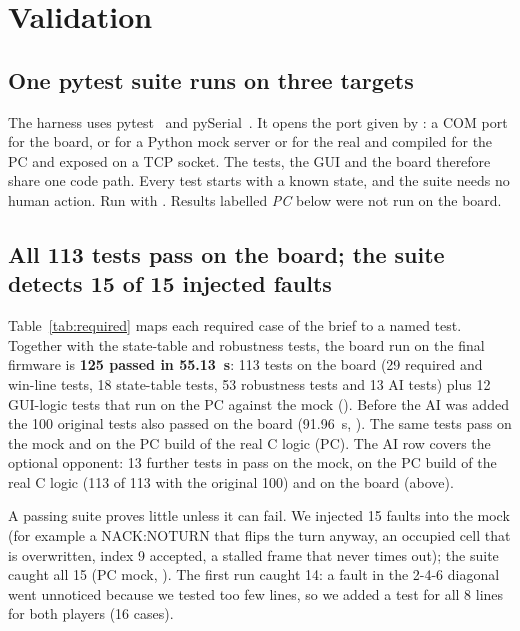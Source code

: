 \section{Validation}
\label{sec:valid}

\subsection{One pytest suite runs on three targets}
The harness uses pytest~\cite{pytest} and pySerial~\cite{pyserial}. It opens the port given by : a COM port for the board, or
 for a Python mock server or for the real  and  compiled for the PC and exposed on a TCP socket.
The tests, the GUI and the board therefore share one code path. Every test starts with a known state, and the suite needs no human
action. Run with . Results labelled \emph{PC} below were not run on the board.

\subsection{All 113 tests pass on the board; the suite detects 15 of 15 injected faults}
Table~\ref{tab:required} maps each required case of the brief to a named test. Together with the state-table and robustness tests, the board
run on the final firmware is \textbf{125 passed in 55.13~s}: 113 tests on the board (29 required and win-line tests, 18 state-table tests, 53 robustness tests and 13 AI tests) plus 12 GUI-logic tests that run on the PC against the mock (). Before the AI was added the 100 original tests also passed on the board (91.96~s, ). The
same tests pass on the mock and on the PC build of the real C logic (PC). The AI row covers the optional  opponent: 13 further tests in  pass on the mock, on the PC build of the real C logic (113 of 113 with the original 100) and on the board (above).

A passing suite proves little unless it can fail. We injected 15 faults into the mock (for example a NACK:NOTURN that flips the turn anyway, an occupied cell that is overwritten, index 9 accepted, a stalled frame that never times out); the suite caught all 15 (PC mock, ). The first run caught 14: a
fault in the 2-4-6 diagonal went unnoticed because we tested too few lines, so we added a test for all 8 lines for both players (16 cases).

